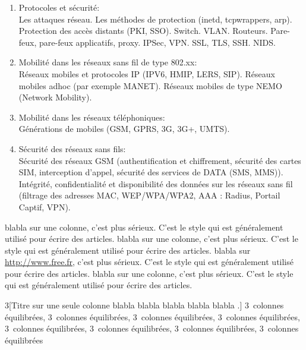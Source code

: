 \documentclass[10pt, a5paper]{report}
\begin{document}

\begin{enumerate}
\item Protocoles et sécurité:\\
Les attaques réseau. Les méthodes de protection (inetd, tcpwrappers, arp).
Protection des accès distants (PKI, SSO). Switch. VLAN. Routeurs.
Pare-feux, pare-feux applicatifs, proxy.
IPSec, VPN.
SSL, TLS, SSH.
NIDS.
\item Mobilité dans les réseaux sans fil de type 802.xx:\\
Réseaux mobiles et protocoles IP (IPV6, HMIP, LERS, SIP).
Réseaux mobiles adhoc (par exemple MANET).
Réseaux mobiles de type NEMO (Network Mobility).
\item Mobilité dans les réseaux téléphoniques:\\
Générations de mobiles (GSM, GPRS, 3G, 3G+, UMTS).
\item Sécurité des réseaux sans fils:\\
Sécurité des réseaux GSM (authentification et chiffrement, sécurité des cartes SIM, interception d'appel, sécurité des services de DATA (SMS, MMS)).
Intégrité, confidentialité et disponibilité des données sur les réseaux sans fil (filtrage des adresses MAC, WEP/WPA/WPA2, AAA : Radius, Portail Captif, VPN). 
\end{enumerate}


   blabla sur une colonne, c'est plus sérieux. C'est le
   style qui est généralement utilisé pour écrire des
   articles.
   blabla sur une colonne, c'est plus sérieux. C'est le
   style qui est généralement utilisé pour écrire des
   articles.
   blabla sur \href{http://www.free.fr}{http://www.free.fr}, c'est plus sérieux. C'est le
   style qui est généralement utilisé pour écrire des
   articles.
   blabla sur une colonne, c'est plus sérieux. C'est le
   style qui est généralement utilisé pour écrire des
   articles.

\begin{multicols}{3}[Titre sur une seule colonne blabla blabla blabla blabla blabla .]
   3~colonnes équilibrées, 3~colonnes équilibrées, 3~colonnes
   équilibrées, 3~colonnes équilibrées, 3~colonnes équilibrées,
   3~colonnes équilibrées, 3~colonnes équilibrées, 3~colonnes équilibrées
\end{multicols}
\end{document}
